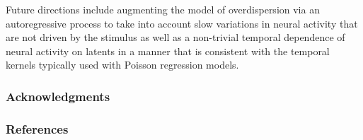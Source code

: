 \documentclass{article} %
\begin{document}
Future directions include augmenting the model of overdispersion via an autoregressive process to take into account slow variations in neural activity that are not driven by the stimulus as well as a non-trivial temporal dependence of neural activity on latents in a manner that is consistent with the temporal kernels typically used with Poisson regression models.  

\subsubsection*{Acknowledgments}


\newpage
\subsubsection*{References}
\begingroup
\renewcommand{\section}[2]{}
{}

\endgroup
\end{document}
